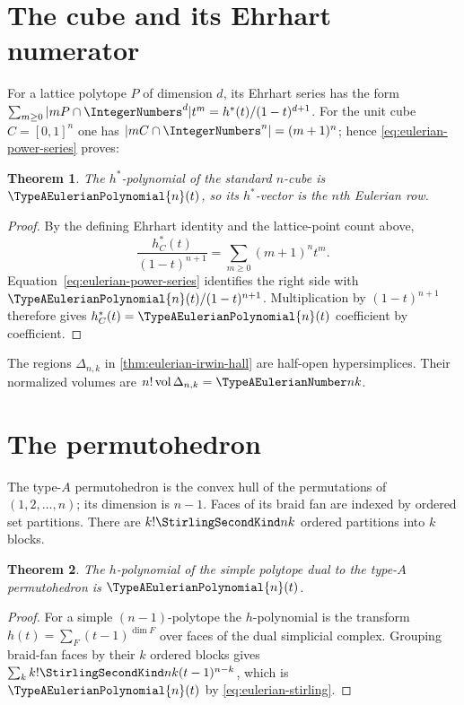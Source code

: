 \documentclass[11pt,a4paper,oneside,openany]{book}
\newtheorem{theorem}{Theorem}[chapter]
\theoremstyle{definition}
\theoremstyle{remark}
\begin{document}
\section{The cube and its Ehrhart numerator}
For a lattice polytope $P$ of dimension $d$, its Ehrhart series has the form
$\sum_{m\ge0}|mP\cap\IntegerNumbers^d|t^m=h^*(t)/(1-t)^{d+1}$.
For the unit cube $C=[0,1]^n$ one has $|mC\cap\IntegerNumbers^n|=(m+1)^n$; hence
\eqref{eq:eulerian-power-series} proves:
\begin{theorem}
The $h^*$-polynomial of the standard $n$-cube is $\TypeAEulerianPolynomial{n}(t)$, so its $h^*$-vector is
the $n$th Eulerian row.
\end{theorem}
\begin{proof}
By the defining Ehrhart identity and the lattice-point count above,
\[
 \frac{h^*_{C}(t)}{(1-t)^{n+1}}
   =\sum_{m\ge0}(m+1)^nt^m.
\]
Equation~\eqref{eq:eulerian-power-series} identifies the right side with
$\TypeAEulerianPolynomial{n}(t)/(1-t)^{n+1}$.  Multiplication by $(1-t)^{n+1}$ therefore gives
$h^*_{C}(t)=\TypeAEulerianPolynomial{n}(t)$ coefficient by coefficient.
\end{proof}

The regions $\Delta_{n,k}$ in \cref{thm:eulerian-irwin-hall} are half-open
hypersimplices.  Their normalized volumes are $n!\operatorname{vol}\Delta_{n,k}
=\TypeAEulerianNumber nk$.

\section{The permutohedron}
The type-$A$ permutohedron is the convex hull of the permutations of
$(1,2,\ldots,n)$; its dimension is $n-1$.  Faces of its braid fan are indexed by
ordered set partitions.  There are $k!\StirlingSecondKind nk$ ordered partitions into $k$
blocks.

\begin{theorem}
The $h$-polynomial of the simple polytope dual to the type-$A$ permutohedron is
$\TypeAEulerianPolynomial{n}(t)$.
\end{theorem}
\begin{proof}
For a simple $(n-1)$-polytope the $h$-polynomial is the transform
$h(t)=\sum_F(t-1)^{\dim F}$ over faces of the dual simplicial complex.  Grouping
braid-fan faces by their $k$ ordered blocks gives
$\sum_k k!\StirlingSecondKind nk(t-1)^{n-k}$, which is $\TypeAEulerianPolynomial{n}(t)$ by
\eqref{eq:eulerian-stirling}.
\end{proof}
\end{document}
